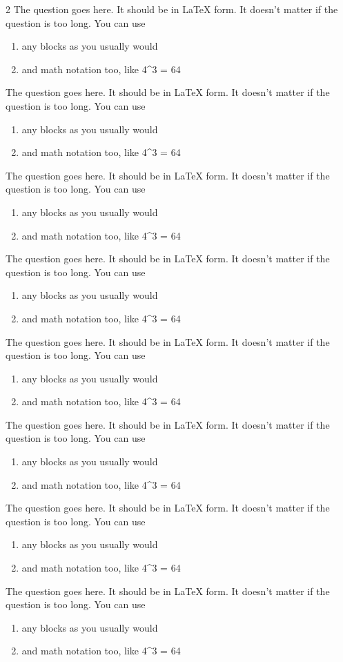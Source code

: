 2
The question goes here. It should be in LaTeX form. It doesn't matter if the question is too long. You can use \begin{enumerate} \item any blocks as you usually would \item and math notation too, like 4^3 = 64 \end{enumerate} %
The question goes here. It should be in LaTeX form. It doesn't matter if the question is too long. You can use \begin{enumerate} \item any blocks as you usually would \item and math notation too, like 4^3 = 64 \end{enumerate} %
The question goes here. It should be in LaTeX form. It doesn't matter if the question is too long. You can use \begin{enumerate} \item any blocks as you usually would \item and math notation too, like 4^3 = 64 \end{enumerate} %
The question goes here. It should be in LaTeX form. It doesn't matter if the question is too long. You can use \begin{enumerate} \item any blocks as you usually would \item and math notation too, like 4^3 = 64 \end{enumerate} %
The question goes here. It should be in LaTeX form. It doesn't matter if the question is too long. You can use \begin{enumerate} \item any blocks as you usually would \item and math notation too, like 4^3 = 64 \end{enumerate} %
The question goes here. It should be in LaTeX form. It doesn't matter if the question is too long. You can use \begin{enumerate} \item any blocks as you usually would \item and math notation too, like 4^3 = 64 \end{enumerate} %
The question goes here. It should be in LaTeX form. It doesn't matter if the question is too long. You can use \begin{enumerate} \item any blocks as you usually would \item and math notation too, like 4^3 = 64 \end{enumerate} %
The question goes here. It should be in LaTeX form. It doesn't matter if the question is too long. You can use \begin{enumerate} \item any blocks as you usually would \item and math notation too, like 4^3 = 64 \end{enumerate} %
